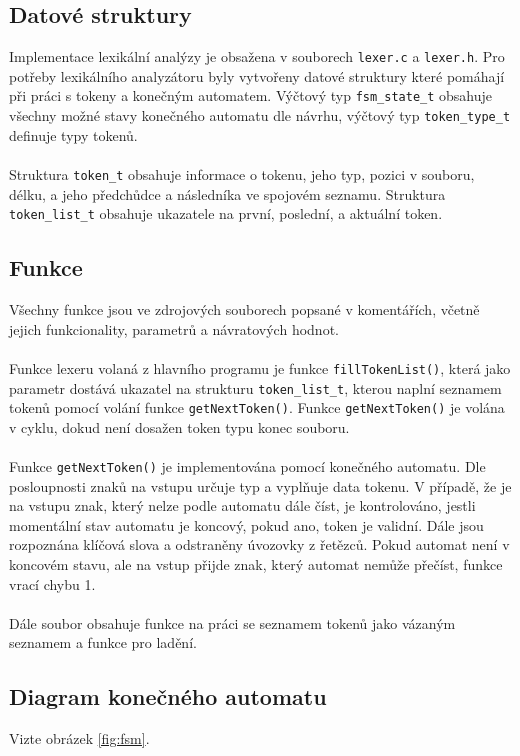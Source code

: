 \documentclass[11pt,a4paper]{article}
\begin{document}
    \subsection{Datové struktury}
    Implementace lexikální analýzy je obsažena v souborech \verb|lexer.c| a \verb|lexer.h|.
    Pro potřeby lexikálního analyzátoru byly vytvořeny datové struktury které pomáhají při
    práci s tokeny a konečným automatem. Výčtový typ \verb|fsm_state_t| obsahuje všechny možné
    stavy konečného automatu dle návrhu, výčtový typ \verb|token_type_t| definuje typy tokenů.
    \\ \\
    Struktura \verb|token_t| obsahuje informace o tokenu, jeho typ, pozici v souboru, délku,
    a jeho předchůdce a následníka ve spojovém seznamu. Struktura \verb|token_list_t| obsahuje
    ukazatele na první, poslední, a aktuální token.

    \subsection{Funkce}
    Všechny funkce jsou ve zdrojových souborech popsané v komentářích, včetně jejich funkcionality, parametrů a návratových hodnot.
    \\ \\
    Funkce lexeru volaná z hlavního programu je funkce \verb|fillTokenList()|, která jako parametr
    dostává ukazatel na strukturu \verb|token_list_t|, kterou naplní seznamem tokenů pomocí volání
    funkce \verb|getNextToken()|. Funkce \verb|getNextToken()| je volána v cyklu, dokud není dosažen token
    typu konec souboru.
    \\ \\
    Funkce \verb|getNextToken()| je implementována pomocí konečného automatu. Dle posloupnosti znaků na vstupu
    určuje typ a vyplňuje data tokenu. V případě, že je na vstupu znak, který nelze podle automatu dále číst,
    je kontrolováno, jestli momentální stav automatu je koncový, pokud ano, token je validní.
    Dále jsou rozpoznána klíčová slova a odstraněny úvozovky z řetězců. Pokud automat není v koncovém stavu,
    ale na vstup přijde znak, který automat nemůže přečíst, funkce vrací chybu 1.
    \\ \\
    Dále soubor obsahuje funkce na práci se seznamem tokenů jako vázaným seznamem a funkce pro ladění.

    \subsection{Diagram konečného automatu}
    Vizte obrázek \ref{fig:fsm}.
    
\end{document}
